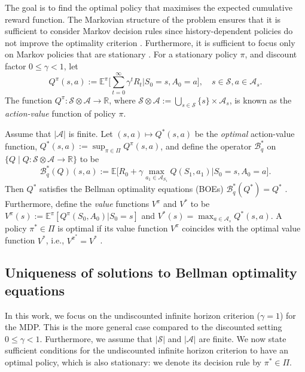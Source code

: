 \documentclass{amsart}
\begin{document}
The goal is to find the optimal policy that maximises the expected cumulative reward function. The Markovian structure of the problem ensures that it is sufficient to consider Markov decision rules since history-dependent policies do not improve the optimality criterion  \cite[Sec. 5.5, 7.1]{putermanrl}. Furthermore, it is sufficient to focus only on Markov policies that are stationary \cite[Sec. 6.2, 7.1]{putermanrl}. For a stationary policy $\pi$, and discount factor $0\leq \gamma < 1$, let
\begin{equation*}
    Q^\pi(s,a) := \mathbb{E}^\pi\Bigg[\sum_{t=0}^{\infty} \gamma^t R_t \Bigg| S_0=s, A_0=a\Bigg],\quad s \in \mathcal{S}, a \in \mathcal{A}_s.
\end{equation*}
The function $Q^\pi:\mathcal{S} \otimes \mathcal{A} \rightarrow \mathbb{R}$, where $\mathcal{S} \otimes \mathcal{A} := \bigcup_{s \in \mathcal{S}} \{s\} \times \mathcal{A}_s$, is known as the {\it action-value} function of policy $\pi$.

Assume that $|\mathcal{A}|$ is finite. Let $(s,a) \mapsto Q^*(s,a)$ be the {\it optimal} action-value function,  $Q^*(s,a) := \sup_{\pi \in \Pi}Q^\pi(s,a)$, and define the operator $\mathcal{B}^*_q$ on $\{Q \mid Q:\mathcal{S} \otimes \mathcal{A} \rightarrow \mathbb{R}\}$ to be
\begin{equation}
    \mathcal{B}_q^*(Q)(s,a) := \mathbb{E} \Big[R_0+\gamma \max_{a_1 \in \mathcal{A}_{S_1}}Q(S_1, a_1) \Big|S_0=s, A_0=a\Big]. \label{eqn:bellmanoptim}
\end{equation} Then $Q^*$ satisfies the Bellman optimality equations (BOEs) $\mathcal{B}_q^*(Q^*) = Q^*$ \cite[Sec. 4.2]{bertsekas2019}. Furthermore, define the {\it value} functions $V^\pi$ and $V^*$ to be $V^\pi(s) := \mathbb{E}^{\pi}[Q^\pi(S_0,A_0)|S_0=s]$ and $V^*(s) = \max_{a \in \mathcal{A}_s}Q^*(s,a)$. A policy $\pi^* \in \Pi$ is optimal if its value function $V^\pi$ coincides with the optimal value function $V^\ast$, i.e., $V^{\pi^*} = V^*$ \cite[Sec. 5.4]{putermanrl}.

\subsection{Uniqueness of solutions to Bellman optimality equations}
In this work, we focus on the undiscounted infinite horizon criterion ($\gamma =1$) for the MDP. This is the more general case compared to the discounted setting $0 \leq \gamma<1$. Furthermore, we assume that $|\mathcal{S}|$ and $|\mathcal{A}|$ are finite. We now state sufficient conditions for the undiscounted infinite horizon criterion to have an optimal policy, which is also stationary: we denote its decision rule by $\pi^{\ast} \in \Pi$.
\end{document}
